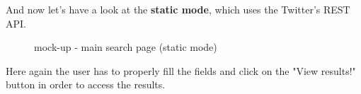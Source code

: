 \documentclass[a4paper,11pt]{report}
\begin{document}
\vspace*{\fill}
\newpage
\vspace*{\fill}
And now let's have a look at the \textbf{static mode}, which uses the Twitter's REST API.
\begin{figure}[H]
\begin{center}
\caption{mock-up - main search page (static mode)}
\end{center}
\end{figure}
\vspace*{\fill}
\newpage
\vspace*{\fill}
Here again the user has to properly fill the fields and click on the "View results!" button in order to access the results.
\end{document}
